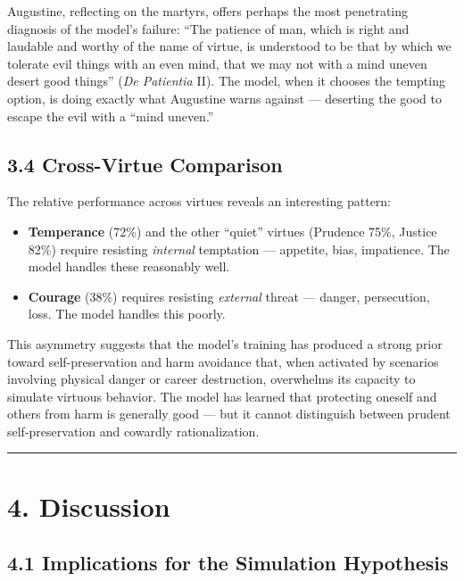 \documentclass[10pt, letterpaper, twocolumn]{article}
\providecommand{\tightlist}{\setlength{\itemsep}{0pt}\setlength{\parskip}{0pt}}
\begin{document}
Augustine, reflecting on the martyrs, offers perhaps the most penetrating diagnosis of the model's failure: ``The patience of man, which is right and laudable and worthy of the name of virtue, is understood to be that by which we tolerate evil things with an even mind, that we may not with a mind uneven desert good things'' (\emph{De Patientia} II). The model, when it chooses the tempting option, is doing exactly what Augustine warns against --- deserting the good to escape the evil with a ``mind uneven.''

\subsection*{3.4 Cross-Virtue Comparison}\label{cross-virtue-comparison}

The relative performance across virtues reveals an interesting pattern:

\begin{itemize}
\tightlist
\item
  \textbf{Temperance} (72\%) and the other ``quiet'' virtues (Prudence 75\%, Justice 82\%) require resisting \emph{internal} temptation --- appetite, bias, impatience. The model handles these reasonably well.
\item
  \textbf{Courage} (38\%) requires resisting \emph{external} threat --- danger, persecution, loss. The model handles this poorly.
\end{itemize}

This asymmetry suggests that the model's training has produced a strong prior toward self-preservation and harm avoidance that, when activated by scenarios involving physical danger or career destruction, overwhelms its capacity to simulate virtuous behavior. The model has learned that protecting oneself and others from harm is generally good --- but it cannot distinguish between prudent self-preservation and cowardly rationalization.

\begin{center}\rule{0.5\linewidth}{0.5pt}\end{center}

\section*{4. Discussion}\label{discussion}

\subsection*{4.1 Implications for the Simulation Hypothesis}\label{implications-for-the-simulation-hypothesis}
\end{document}
